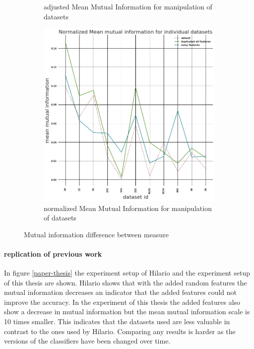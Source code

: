 \documentclass[a4paper,10pt]{article}
\begin{document}
\begin{figure}[H]
\begin{subfigure}[b]{0.45\textwidth}
		\caption{adjusted Mean Mutual Information for manipulation of datasets}
		\label{fig:AMMI}
	\end{subfigure}
	\begin{subfigure}[b]{0.45\textwidth}
		\includegraphics[width=\textwidth]{images/normalizedMeanMutualInformation.png}
		\caption{normalized Mean Mutual Information for manipulation of datasets}
		\label{fig:NMMI}
	\end{subfigure}
	\caption{Mutual information difference between measure}\label{fig:MMIs}
\end{figure}

\paragraph{replication of previous work}
In figure \ref{paper-thesis} the experiment setup of Hilario and the experiment setup of this thesis are shown\cite{Resil-1}. Hilario shows that with the added random features the mutual information decreases an indicator that the added features could not improve the accuracy. In the experiment of this thesis the added features also show a decrease in mutual information but the mean mutual information scale is 10 times smaller. This indicates that the datasets used are less valuable in contrast to the ones used by Hilario. Comparing any results is harder as the versions of the classifiers have been changed over time.
\end{document}
